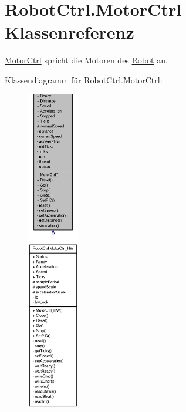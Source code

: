 \hypertarget{class_robot_ctrl_1_1_motor_ctrl}{
\section{RobotCtrl.MotorCtrl Klassenreferenz}
\label{class_robot_ctrl_1_1_motor_ctrl}
}


\hyperlink{class_robot_ctrl_1_1_motor_ctrl}{MotorCtrl} spricht die Motoren des \hyperlink{class_robot_ctrl_1_1_robot}{Robot} an.  




Klassendiagramm für RobotCtrl.MotorCtrl:\nopagebreak
\begin{figure}[H]
\begin{center}
\leavevmode
\includegraphics[height=400pt]{class_robot_ctrl_1_1_motor_ctrl__inherit__graph}
\end{center}
\end{figure}
